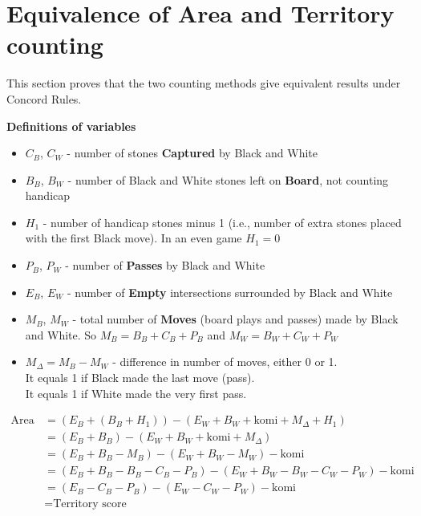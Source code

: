 \documentclass[11pt]{article}
\begin{document}
\newpage
\section*{Equivalence of Area and Territory counting}

This section proves that the two counting methods give equivalent results under Concord Rules.

\textbf{Definitions of variables}

\begin{itemize}
\item $C_B$, $C_W$ - number of stones \textbf{Captured} by Black and White
\item $B_B$, $B_W$ - number of Black and White stones left on \textbf{Board}, not counting handicap
\item $H_1$ - number of handicap stones minus 1 (i.e., number of extra stones placed with the first Black move).
In an even game $H_1 = 0$
\item $P_B$, $P_W$ - number of \textbf{Passes} by Black and White
\item $E_B$, $E_W$ - number of \textbf{Empty} intersections surrounded by Black and White
\item $M_B$, $M_W$ - total number of \textbf{Moves} (board plays and passes) made by Black and White.
So $M_B = B_B + C_B + P_B$ and $M_W = B_W + C_W + P_W$
\item $M_\Delta = M_B - M_W$ - difference in number of moves, either 0 or 1. \\
It equals 1 if Black made the last move (pass).\\
It equals 1 if White made the very first pass.
\end{itemize}

\begin{align}
\text{Area score} &= (E_B + (B_B+H_1)) - (E_W + B_W + \text{komi} + M_\Delta + H_1) \\
&= (E_B + B_B) - (E_W + B_W + \text{komi} + M_\Delta) \\
&= (E_B + B_B - M_B) - (E_W + B_W - M_W) - \text{komi} \\
&= (E_B + B_B - B_B - C_B - P_B ) - (E_W + B_W - B_W - C_W - P_W) - \text{komi} \\
&= (E_B - C_B - P_B) - (E_W - C_W - P_W) - \text{komi} \\
&= \text{Territory score}
\end{align}
\end{document}
